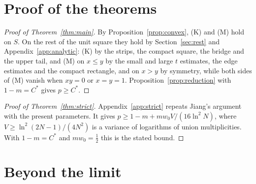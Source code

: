 \documentclass[12pt]{article}
\theoremstyle{plain}
\newcommand{\Cs}{C^{*}}
\begin{document}
\section{Proof of the theorems}\label{sec:proofs}

\begin{proof}[Proof of Theorem~\ref{thm:main}]
By Proposition~\ref{prop:convex}, (K) and (M) hold on $S$. On the rest of the unit square they hold by Section~\ref{sec:rest} and Appendix~\ref{app:analytic}: (K) by the strips, the compact square, the bridge and the upper tail, and (M) on $x\le y$ by the small and large $t$ estimates, the edge estimates and the compact rectangle, and on $x>y$ by symmetry, while both sides of (M) vanish when $xy=0$ or $x=y=1$. Proposition~\ref{prop:reduction} with $1-m=\Cs$ gives $p\ge\Cs$.
\end{proof}

\begin{proof}[Proof of Theorem~\ref{thm:strict}]
Appendix~\ref{app:strict} repeats Jiang's argument \cite[Proposition~10.3]{Jia26} with the present parameters. It gives $p\ge 1-m+mw_0V/(16\ln^2N)$, where $V\ge\ln^2(2N-1)/(4N^2)$ is a variance of logarithms of union multiplicities. With $1-m=\Cs$ and $mw_0=\frac12$ this is the stated bound.
\end{proof}

\section{Beyond the limit}\label{sec:beyond}
\end{document}

